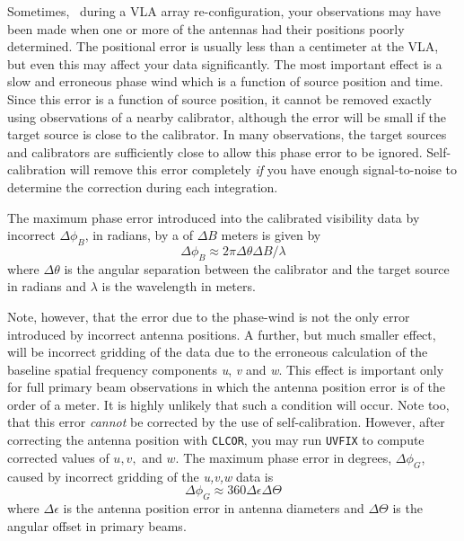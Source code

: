 
     Sometimes, \eg\ during a VLA array re-configuration, your
observations may have been made when one or more of the antennas had
their positions poorly determined.  The positional error is usually
less than a centimeter at the VLA, but even this may affect your data
significantly.  The most important effect is a slow and erroneous
phase wind which is a function of source position and time.  Since
this error is a function of source position, it cannot be removed
exactly using observations of a nearby calibrator, although the error
will be small if the target source is close to the calibrator.  In
many observations, the target sources and calibrators are sufficiently
close to allow this phase error to be ignored.  Self-calibration will
remove this error completely {\it if\/} you have enough
signal-to-noise to determine the correction during each integration.

    The maximum phase error introduced into the calibrated visibility
data by incorrect  $\Delta\phi_{B}$, in
radians, by a  of $\Delta B$ meters is given by
    $$\Delta\phi_{B} \approx 2\pi\Delta\theta\Delta B / \lambda$$
where $\Delta\theta$ is the angular separation between the calibrator
and the target source in radians and $\lambda$ is the wavelength in
meters.

    Note, however, that the error due to the phase-wind is not the
only error introduced by incorrect antenna positions.  A further, but
much smaller effect, will be incorrect gridding of the data due to the
erroneous calculation of the baseline spatial frequency components
{\it u\/}, {\it v\/} and {\it w\/}.  This effect is important only for
full primary beam observations in which the antenna position error is
of the order of a meter.  It is highly unlikely that such a condition
will occur.  Note too, that this error {\it cannot\/} be corrected by
the use of self-calibration.  However, after correcting the antenna
position with {\tt CLCOR}, you may run {\tt UVFIX} to compute
corrected values of $u, v,$ and $w$.  The maximum phase error in
degrees, $\Delta\phi_{G}$, caused by incorrect gridding of the {\it
u,v,w\/} data is
       $$\Delta\phi_{G} \approx 360 \Delta\epsilon \Delta\Theta$$
where $\Delta\epsilon$ is the antenna position error in antenna
diameters and $\Delta\Theta$ is the angular offset in primary beams.

